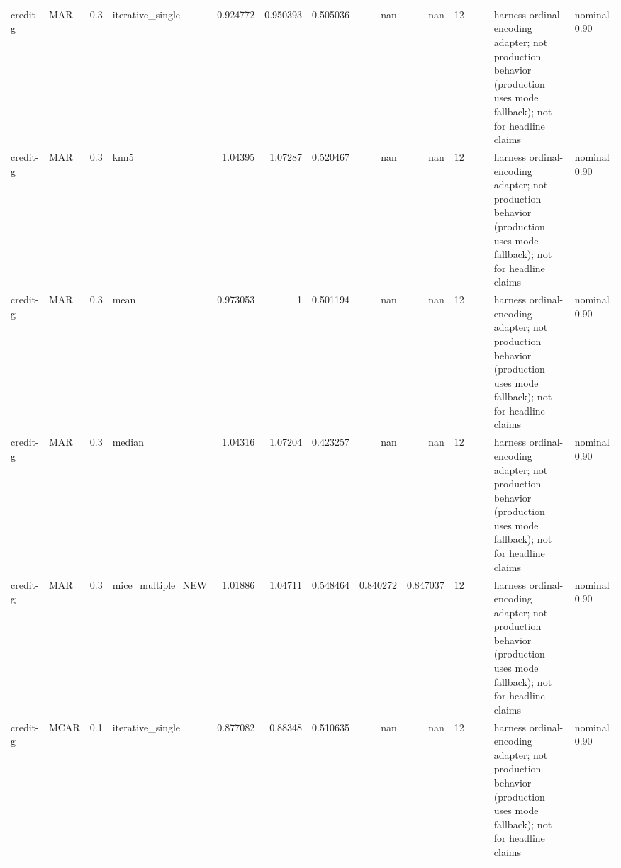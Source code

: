 \begin{table}[ht]
\begin{tabular}{llrlrrrrrrllll}
 credit-g             & MAR         &         0.3 & iterative\_single  &       0.924772 &             0.950393 &                 0.505036 &                     nan        &                       nan        &        12 &                    &                                         & harness ordinal-encoding adapter; not production behavior (production uses mode fallback); not for headline claims & nominal 0.90              \\
 credit-g             & MAR         &         0.3 & knn5              &       1.04395  &             1.07287  &                 0.520467 &                     nan        &                       nan        &        12 &                    &                                         & harness ordinal-encoding adapter; not production behavior (production uses mode fallback); not for headline claims & nominal 0.90              \\
 credit-g             & MAR         &         0.3 & mean              &       0.973053 &             1        &                 0.501194 &                     nan        &                       nan        &        12 &                    &                                         & harness ordinal-encoding adapter; not production behavior (production uses mode fallback); not for headline claims & nominal 0.90              \\
 credit-g             & MAR         &         0.3 & median            &       1.04316  &             1.07204  &                 0.423257 &                     nan        &                       nan        &        12 &                    &                                         & harness ordinal-encoding adapter; not production behavior (production uses mode fallback); not for headline claims & nominal 0.90              \\
 credit-g             & MAR         &         0.3 & mice\_multiple\_NEW &       1.01886  &             1.04711  &                 0.548464 &                       0.840272 &                         0.847037 &        12 &                    &                                         & harness ordinal-encoding adapter; not production behavior (production uses mode fallback); not for headline claims & nominal 0.90              \\
 credit-g             & MCAR        &         0.1 & iterative\_single  &       0.877082 &             0.88348  &                 0.510635 &                     nan        &                       nan        &        12 &                    &                                         & harness ordinal-encoding adapter; not production behavior (production uses mode fallback); not for headline claims & nominal 0.90              \\

\end{tabular}
\end{table}
